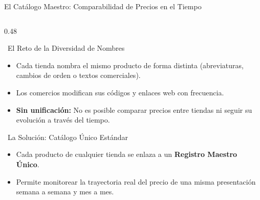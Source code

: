 \documentclass[aspectratio=169, 10pt]{beamer}
\providecommand{\faCheckDouble}{\faCheckCircle}
\begin{document}
\begin{frame}{El Catálogo Maestro: Comparabilidad de Precios en el Tiempo}
    \begin{columns}[T]
        \begin{column}{0.48\textwidth}
            \begin{block}{\faExclamationTriangle\ El Reto de la Diversidad de Nombres}
                \scriptsize
                \begin{itemize}
                    \item Cada tienda nombra el mismo producto de forma distinta (abreviaturas, cambios de orden o textos comerciales).
                    \item Los comercios modifican sus códigos y enlaces web con frecuencia.
                    \item \textbf{Sin unificación:} No es posible comparar precios entre tiendas ni seguir su evolución a través del tiempo.
                \end{itemize}
            \end{block}
            \vspace{0.15cm}
            \begin{block}{\faCheckDouble\ La Solución: Catálogo Único Estándar}
                \scriptsize
                \begin{itemize}
                    \item Cada producto de cualquier tienda se enlaza a un \textbf{Registro Maestro Único}.
                    \item Permite monitorear la trayectoria real del precio de una misma presentación semana a semana y mes a mes.
                \end{itemize}
            \end{block}
        \end{column}


\end{columns}
\end{frame}
\end{document}
